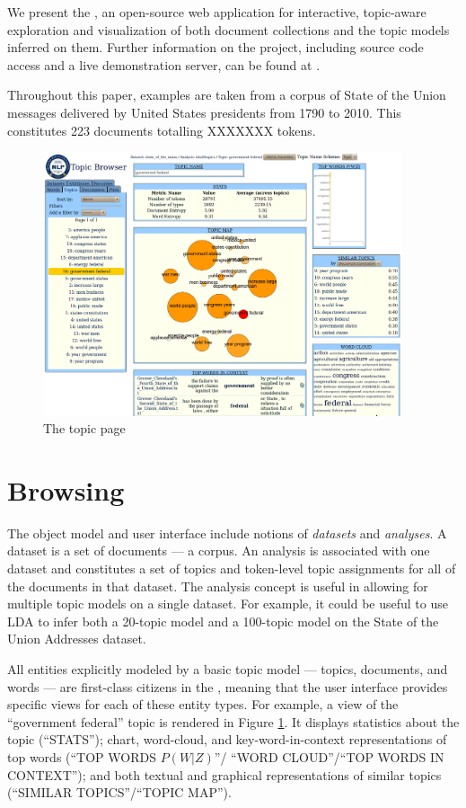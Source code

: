 \documentclass[11pt]{article}
\begin{document}
We present the \tool, an open-source web application for interactive,
topic-aware exploration and visualization of both document collections and the
topic models inferred on them. Further information on the project, including
source code access and a live demonstration server, can be found
at \texttt{\projecturl}.

Throughout this paper, examples are taken from a
corpus of State of the Union messages delivered by United States presidents
from 1790 to 2010. This constitutes 223 documents totalling XXXXXXX tokens. %

\begin{figure}[t]
 \centering
 \includegraphics[width=400px,keepaspectratio=true]{./topic_page_take2.png}
 \caption{The topic page}
 \label{fig:topic_page}
\end{figure}


\section{Browsing}%
The \tool{} object model and user interface include notions of
\textit{datasets} and \textit{analyses}.
A dataset is a set of documents --- a corpus. An analysis is associated with one
dataset and constitutes a set of topics and token-level topic assignments for
all of the documents in that dataset. The analysis concept is useful in
allowing for multiple topic models on a single dataset. For example,
it could be useful to use LDA to infer both a 20-topic model and a 100-topic model
on the State of the Union Addresses dataset.

All entities explicitly modeled by a basic topic model --- topics, documents, and
words --- are first-class citizens in the \tool, meaning that the user
interface provides specific views for each of these entity types. For example, a
view of the ``government federal'' topic is rendered in Figure \ref{fig:topic_page}.
It displays statistics about the topic (``STATS''); chart, word-cloud, and
key-word-in-context representations of top words (``TOP WORDS $P(W|Z)$''/
``WORD CLOUD''/``TOP WORDS IN CONTEXT''); and both textual and graphical
representations of similar topics (``SIMILAR TOPICS''/``TOPIC MAP'').
\end{document}
